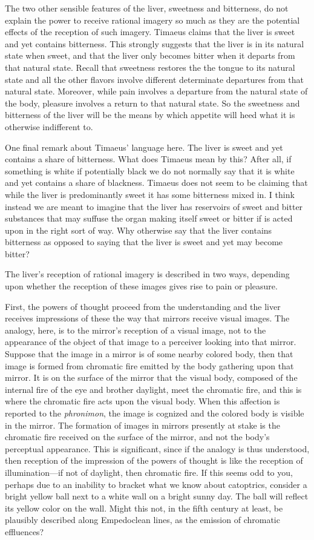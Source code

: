 The two other sensible features of the liver, sweetness and bitterness, do not explain the power to receive rational imagery so much as they are the potential effects of the reception of such imagery. Timaeus claims that the liver is sweet and yet contains bitterness. This strongly suggests that the liver is in its natural state when sweet, and that the liver only becomes bitter when it departs from that natural state. Recall that sweetness restores the the tongue to its natural state and all the other flavors involve different determinate departures from that natural state. Moreover, while pain involves a departure from the natural state of the body, pleasure involves a return to that natural state. So the sweetness and bitterness of the liver will be the means by which appetite will heed what it is otherwise indifferent to. 

One final remark about Timaeus' language here. The liver is sweet and yet contains a share of bitterness. What does Timaeus mean by this? After all, if something is white if potentially black we do not normally say that it is white and yet contains a share of blackness. Timaeus does not seem to be claiming that while the liver is predominantly sweet it has some bitterness mixed in. I think instead we are meant to imagine that the liver has reservoirs of sweet and bitter substances that may suffuse the organ making itself sweet or bitter if is acted upon in the right sort of way. Why otherwise say that the liver contains bitterness as opposed to saying that the liver is sweet and yet may become bitter?

The liver's reception of rational imagery is described in two ways, depending upon whether the reception of these images gives rise to pain or pleasure. 

First, the powers of thought proceed from the understanding and the liver receives impressions of these the way that mirrors receive visual images. The analogy, here, is to the mirror's reception of a visual image, not to the appearance of the object of that image to a perceiver looking into that mirror. Suppose that the image in a mirror is of some nearby colored body, then that image is formed from chromatic fire emitted by the body gathering upon that mirror. It is on the surface of the mirror that the visual body, composed of the internal fire of the eye and brother daylight, meet the chromatic fire, and this is where the chromatic fire acts upon the visual body. When this affection is reported to the \emph{phronimon}, the image is cognized and the colored body is visible in the mirror. The formation of images in mirrors presently at stake is the chromatic fire received on the surface of the mirror, and not the body's perceptual appearance. This is significant, since if the analogy is thus understood, then reception of the impression of the powers of thought is like the reception of illumination---if not of daylight, then chromatic fire. If this seems odd to you, perhaps due to an inability to bracket what we know about catoptrics, consider a bright yellow ball next to a white wall on a bright sunny day. The ball will reflect its yellow color on the wall. Might this not, in the fifth century at least, be plausibly described along Empedoclean lines, as the emission of chromatic effluences? 

